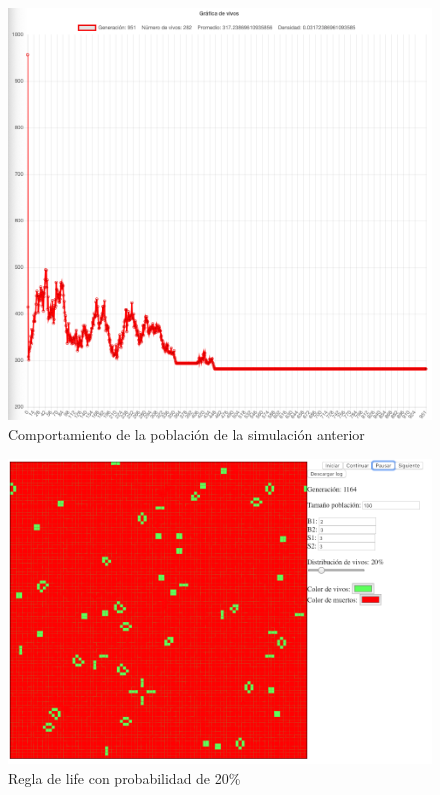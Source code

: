 	\begin{figure}[H]
		\begin{center}
			\includegraphics[scale=.24]{GOL/img/life10-2.png}
			\caption{Comportamiento de la población de la simulación anterior}
			\label{fig:gol5}
		\end{center}
	\end{figure}

	\begin{figure}[H]
		\begin{center}
			\includegraphics[scale=.3]{GOL/img/life20-1.png}
			\caption{Regla de life con probabilidad de 20\%}
			\label{fig:gol5}
		\end{center}
	\end{figure}

